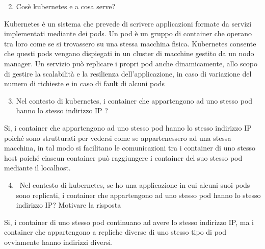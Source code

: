 \documentclass[
]{article}
\providecommand{\tightlist}{%
  \setlength{\itemsep}{0pt}\setlength{\parskip}{0pt}}
\begin{document}
{}

{}

{}

\begin{enumerate}
\setcounter{enumi}{1}
\tightlist
\item
  {Cos\textquotesingle è kubernetes e a cosa serve?}
\end{enumerate}

{}

{Kubernetes è un sistema che prevede di scrivere applicazioni formate da
servizi implementati mediante dei pods. Un pod è un gruppo di container
che operano tra loro come se si trovassero su una stessa macchina
fisica. Kubernetes consente che questi pods vengano dispiegati in un
cluster di macchine gestito da un nodo manager. Un servizio può
replicare i propri pod anche dinamicamente, allo scopo di gestire la
scalabilità e la resilienza dell'applicazione, in caso di variazione del
numero di richieste e in caso di fault di alcuni pods}

{}

{}

{}

\begin{enumerate}
\setcounter{enumi}{2}
\tightlist
\item
  {Nel contesto di kubernetes, i container che appartengono ad uno
  stesso pod hanno lo stesso indirizzo IP ?}
\end{enumerate}

{}

{Si, i container che appartengono ad uno stesso pod hanno lo stesso
indirizzo IP poiché sono strutturati per vedersi come se appartenessero
ad una stessa macchina, in tal modo si facilitano le comunicazioni tra i
container di uno stesso host poiché ciascun container può raggiungere i
container del suo stesso pod mediante il localhost. }

{}

{}

\begin{enumerate}
\setcounter{enumi}{3}
\tightlist
\item
  {~Nel contesto di kubernetes, se ho una applicazione in cui alcuni
  suoi pods sono replicati, i container che appartengono ad uno stesso
  pod hanno lo stesso indirizzo IP? Motivare la risposta}
\end{enumerate}

{}

{Si, i container di uno stesso pod continuano ad avere lo stesso
indirizzo IP, ma i container che appartengono a repliche diverse di uno
stesso tipo di pod ovviamente hanno indirizzi diversi.}
\end{document}
